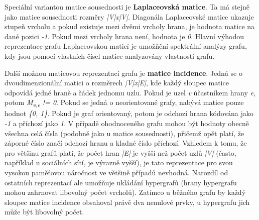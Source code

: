 Speciální variantou matice sousednosti je \textbf{Laplaceovská matice}. Ta má stejně jako matice sousednosti rozměry \textit{|V|x|V|}. Diagonála Laplaceovské matice ukazuje stupeň vrcholu a pokud existuje mezi dvěmi vrcholy hrana, je hodnota matice na dané pozici \textit{-1}. Pokud mezi vrcholy hrana není, hodnota je \textit{0}. Hlavní výhodou reprezentace grafu Laplaceovskou maticí je umožňění spektrální analýzy grafu\cite{Barnard93}, kdy jsou pomocí vlastních čísel matice analyzovány vlastnosti grafu.

Další možnou maticovou reprezentací grafu je \textbf{matice incidence}. Jedná se o dvoudimenzionální matici o rozměrech \textit{|V|x|E|}, kde každý sloupec matice odpovídá jedné hraně a řádek jednomu uzlu. Pokud je uzel \textit{v} účastníkem hrany \textit{e}, potom \textit{M\textsubscript{v,e} != 0}. Pokud se jedná o neorientované grafy, nabývá matice pouze hodnot \textit{\{0, 1\}}. Pokud je graf orientovaný, potom je odchozí hrana kódována jako \textit{-1} a příchozí jako \textit{1}. V případě ohodnoceného grafu mohou být hodnoty obecně všechna celá čísla (podobně jako u matice sousednosti), přičemž opět platí, že záporné číslo značí odchozí hranu a kladné číslo příchozí. Vzhledem k tomu, že pro většinu grafů platí, že počet hran \textit{|E|} je vyšší než počet uzlů \textit{|V|} (často, například u sociálních sítí, je výrazně vyšší), je tato reprezentace pro svou vysokou paměťovou náročnost ve většině případů nevhodná. Narozdíl od ostatních reprezentací ale umožňuje ukládání hypergrafů (hrany hypergrafu mohou zahrnovat libovolný počet vrcholů). Zatímco u běžného grafu by každý sloupec matice incidence obsahoval právě dva nenulové prvky, u hypergrafu jich může být libovolný počet.

